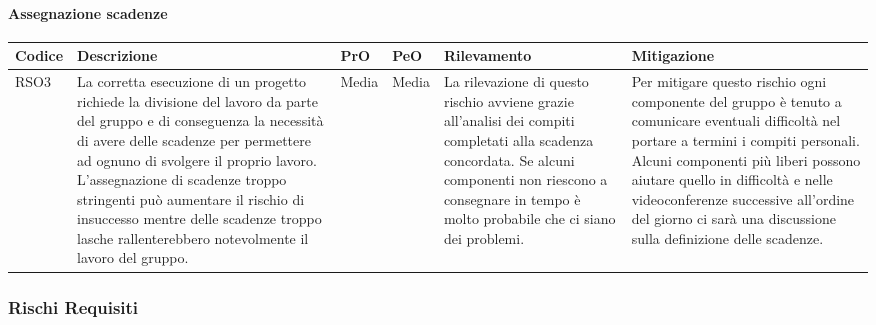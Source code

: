 \paragraph{Assegnazione scadenze}
		\begin{center}

	\begin{longtable}{p{1cm}|p{4cm}|p{0.7cm}|p{0.7cm}|p{3cm}|p{4cm}}
		\arrayrulecolor{white}
		\hline
		\rowcolor{blue!20}
		\textbf{Codice} & 
		\textbf{Descrizione} &
		\textbf{PrO}  &
		\textbf{PeO}  &				        
		\textbf{Rilevamento} &
		\textbf{Mitigazione} \\
		\hline	
		RSO3 & La corretta esecuzione di un progetto richiede la divisione del lavoro da parte del gruppo e di conseguenza la necessità di avere delle scadenze per permettere ad ognuno di svolgere il proprio lavoro. L'assegnazione di scadenze troppo stringenti può aumentare il rischio di insuccesso mentre delle scadenze troppo lasche rallenterebbero notevolmente il lavoro del gruppo. & Media & Media & La rilevazione di questo rischio avviene grazie all'analisi dei compiti completati alla scadenza concordata. Se alcuni componenti non riescono a consegnare in tempo è molto probabile che ci siano dei problemi. & Per mitigare questo rischio ogni componente del gruppo è tenuto a comunicare eventuali difficoltà nel portare a termini i compiti personali. Alcuni componenti più liberi possono aiutare quello in difficoltà e nelle videoconferenze successive all'ordine del giorno ci sarà una discussione sulla definizione delle scadenze. \\
		\end{longtable}
\end{center}
\subsubsection{Rischi Requisiti}
